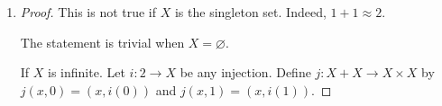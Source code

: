 \documentclass[a4paper]{article}
\newcommand{\To}[3]{#1\colon#2\to#3}
\let\P\relax
\newcommand{\P}{\mathcal{P}}
\begin{document}
\begin{enumerate}
\begin{proof}
    If $X$ is infinite, there is an evident injection $2^{X} \to X^{X}$.
    Consider the function $\To{j}{X^{X}}{\P(X \times X)}$ defined by \[j(f) = \{(x,f(x)) \mid x \in X\}.\]
    If $j(f) = j(g)$ then for any $x \in X$, we have $(x,f(x)) = (x,g(x))$, so $f(x) = g(x)$.
    Then functional extensionality implies that $f = g$.
    Thus, the following composition gives the required injection.
    \[\begin{tikzcd}
	{X^{X}} \\
	\\
	{\P(X \times X)} & {\P(X)} & {2^{X}}
	\arrow["j"', tail, from=1-1, to=3-1]
	\arrow[dashed, tail, from=1-1, to=3-3]
	\arrow["\approx"{description}, draw=none, from=3-1, to=3-2]
	\arrow["\approx"{description}, draw=none, from=3-2, to=3-3]
      \end{tikzcd}\]
  \end{proof}
\item
  \begin{proof}
    This is not true if $X$ is the singleton set.
    Indeed, $1 + 1 \approx 2$.

    The statement is trivial when $X = \varnothing$.

    If $X$ is infinite.
    Let $\To{i}{2}{X}$ be any injection.
    Define $\To{j}{X + X}{X \times X}$ by $j(x,0) = (x,i(0))$ and $j(x,1) = (x,i(1))$.
  \end{proof}
\end{enumerate}

\end{document}
